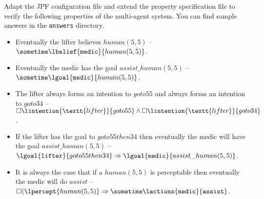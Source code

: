 \documentclass[a4]{article}
\begin{document}
Adapt the JPF configuration file and extend the property specification file to verify the following properties of the multi-agent system.  You can find sample answers in the \texttt{answers} directory.

\begin{itemize}
\item Eventually the lifter believes $human(5, 5)$ -- $\sometime \lbelief{\texttt{medic}}{human(5, 5)}$.
\item Eventually the medic has the goal $assist\_human(5, 5)$ -- $\sometime \lgoal{\texttt{medic}}{human(5, 5)}$.
\item The lifter always forms an intention to $goto55$ and always forms an intention to $goto34$ -- $\always \lintention{\textt{lifter}}{goto55} \wedge \always \lintention{\textt{lifter}}{goto34}$.
\item If the lifter has the goal to $goto55then34$ then eventually the medic will have the goal $assist\_human(5, 5)$ -- $\lgoal{\texttt{lifter}}{goto55then34} \Rightarrow \lgoal{\texttt{medic}}{assist\_human(5, 5)}$.
\item It is always the case that if a $human(5, 5)$ is perceptable then eventually the medic will do $assist$ -- $\always (\lpercept{human(5, 5)} \Rightarrow \sometime \lactions{\texttt{medic}}{\texttt{assist}}$.
\end{itemize}
\end{document}
